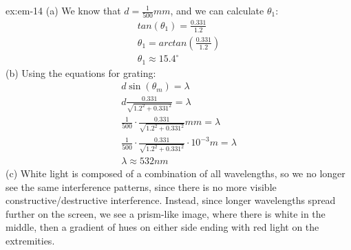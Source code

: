 \begin{solution}{ex:em-14}
  (a) We know that $d=\frac{1}{500}mm$, and we can calculate $\theta_1$:
  \[
    \begin{gathered}
      tan(\theta_1)=\frac{0.331}{1.2}\\
      \theta_1=arctan(\frac{0.331}{1.2})\\
      \theta_1\approx 15.4^\circ
    \end{gathered}
  \]
  (b)
  Using the equations for grating:
  \[
    \begin{gathered}
      d \sin(\theta_m)=\lambda\\
      d \frac{0.331}{\sqrt{1.2^2+0.331^2}} = \lambda\\
      \frac{1}{500} \cdot \frac{0.331}{\sqrt{1.2^2+0.331^2}}mm= \lambda \\
      \frac{1}{500} \cdot \frac{0.331}{\sqrt{1.2^2+0.331^2}} \cdot 10^{-3} m= \lambda \\
      \lambda \approx 532 nm
    \end{gathered}
  \]
  (c)
  White light is composed of a combination of all wavelengths, so we no longer see the same interference patterns, since there is no more visible constructive/destructive interference. Instead, since longer wavelengths spread further on the screen, we see a prism-like image, where there is white in the middle, then a gradient of hues on either side ending with red light on the extremities.
\end{solution}
